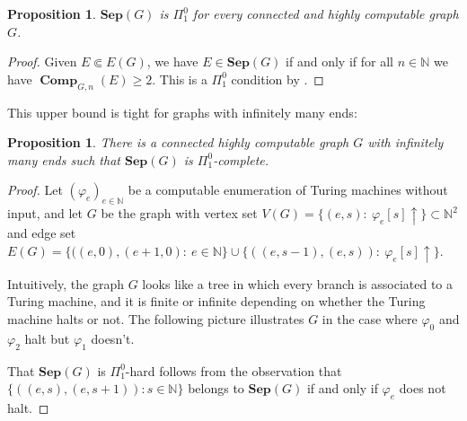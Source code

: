 \documentclass[10pt,A4]{amsart}
\newtheorem{prop}[thm]{Proposition}
\theoremstyle{definition}
\theoremstyle{definition}
\newcommand{\N}{\mathbb{N}}
\newcommand{\sep}[1]{\mathbf{Sep}({#1})}
\newcommand{\comp}{\operatorname{\mathbf{Comp}}}
\begin{document}
\begin{prop}
\label{prop:decide-only-one-inf-comp} $\sep{G}$ is $\Pi_{1}^{0}$ for every connected and highly computable graph $G$.
\end{prop}
\begin{proof}
    Given $E\Subset E(G)$, we have $E\in\sep{G}$ if and only if for all $n\in\N$ we have $ \comp_{G,n}(E)\geq 2$. This is a $\Pi_1^0$ condition by .
\end{proof}
This upper bound is tight for graphs with infinitely many ends:
\begin{prop}\label{example-graph-whose-sep-is-halting-complete}
    There is a connected highly computable graph $G$ with infinitely many ends such that $\sep{G}$ is $\Pi_1^0$-complete.   
\end{prop}
\begin{proof}  Let $(\varphi_e)_{e \in \N}$ be a computable enumeration of Turing machines without input, and let $G$ be the graph with vertex set $V(G) = \{ (e,s): \ \varphi_e[s] \uparrow \} \subset \N^2$ and  edge set $E(G) = \{((e,0),(e+1,0): \ e \in \N \} \cup \{((e,s-1),(e,s)): \ \varphi_e[s] \uparrow \}$. 

Intuitively, the graph $G$ looks like a tree in which every branch is associated to a Turing machine, and it is finite or infinite depending on whether the Turing machine halts or not. The following picture illustrates $G$ in the case where $\varphi_0$ and $\varphi_2$ halt but $\varphi_1$ doesn't.
    \begin{tcolorbox}
    \begin{center}
    
    \end{center}
    \end{tcolorbox}
That $\sep{G}$ is $\Pi_1^0$-hard follows from the observation that $\{((e,s),(e,s+1)) : s \in \N\}$ belongs to $\sep{G}$ if and only if $\varphi_e$ does not halt. 
\end{proof}
\end{document}
